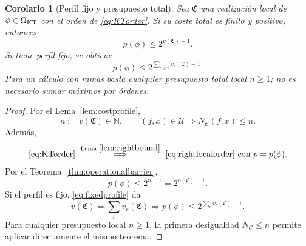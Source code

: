 \documentclass[11pt,a4paper]{article}
\numberwithin{equation}{section}
\newtheorem{corollary}[theorem]{Corolario}
\theoremstyle{definition}
\theoremstyle{remark}
\newcommand{\N}{\mathbb N}
\begin{document}
\begin{corollary}[Perfil fijo y presupuesto total]\label{cor:profilebound}
Sea $\mathfrak C$ una realización local de $\phi\in\Omega_{\rm KT}$ con el orden de \eqref{eq:KTorder}.
Si su coste total es finito y positivo, entonces
\[
p(\phi)\le2^{v(\mathfrak C)-1}.
\]
Si tiene perfil fijo, se obtiene
\[
p(\phi)\le2^{\sum_{r\ge0}v_r(\mathfrak C)-1}.
\]
Para un cálculo con ramas basta cualquier presupuesto total local $n\ge1$; no es necesario sumar máximos por órdenes.
\end{corollary}
\begin{proof}
Por el Lema~\ref{lem:costprofile},
\[
n:=v(\mathfrak C)\in\N,\qquad
(f,x)\in\mathcal U\Longrightarrow N_{\mathscr C}(f,x)\le n.
\]
Además,
\[
\eqref{eq:KTorder}\ \overset{\text{Lema }\ref{lem:rightbound}}{\Longrightarrow}\
\eqref{eq:rightlocalorder}\text{ con }p=p(\phi).
\]
Por el Teorema~\ref{thm:operationalbarrier},
\[
p(\phi)\le2^{n-1}=2^{v(\mathfrak C)-1}.
\]
Si el perfil es fijo, \eqref{eq:fixedprofile} da
\[
v(\mathfrak C)=\sum_rv_r(\mathfrak C)
\Longrightarrow p(\phi)\le2^{\sum_rv_r(\mathfrak C)-1}.
\]
Para cualquier presupuesto local $n\ge1$, la primera desigualdad $N_{\mathscr C}\le n$ permite aplicar directamente el mismo teorema.
\end{proof}
\end{document}
